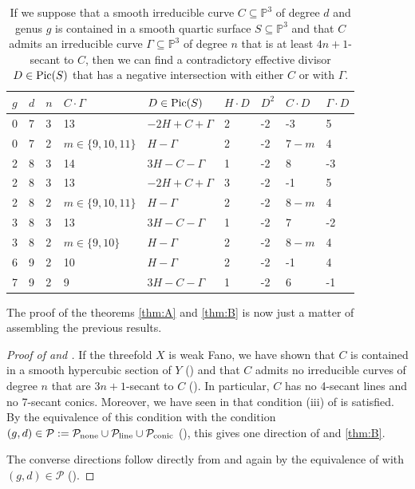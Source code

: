 \documentclass[english,11pt,reqno]{amsart}
\newcommand{\sub}{\subseteq}
\newcommand{\Pthree}{\mathbb{P}^3}
\newcommand{\Pic}{\textup{Pic}}
\begin{document}
%
\begin{table}[H]
	\caption{If we suppose that a smooth irreducible curve $C\sub \Pthree$ of degree $d$ and genus $g$ is contained in a smooth quartic surface $S\sub\Pthree$ and that $C$ admits an irreducible curve $\Gamma\sub \Pthree$ of degree $n$ that is at least $4n+1$-secant to $C$, then we can find a contradictory effective divisor $D\in \Pic(S)$ that has a negative intersection with either $C$ or with $\Gamma$.}
	\label{table:finding_contradictory_divisors_Pthree}
	\begin{minipage}{\textwidth}
		\centering
		\vspace{0.5cm}
		\begin{tabular}{|l|l|l|l|l|l|l|l|l|}
			\hline
			$g$ & $d$ & $n$ & $C\cdot \Gamma$ & $D\in \Pic(S)$ & $H\cdot D$ & $D^2$ & $C\cdot D $ & $\Gamma \cdot D$ \\
			\hline
			0 & 7&3&13& $-2H+C+\Gamma$ & 2 & -2 & -3 & 5\\
			\hline		
			0&7&2 & $m\in\{9,10,11\}$& $H-\Gamma$ & 2 & -2 & $7-m$ & 4\\
			\hline 
			2&8&3 & 14& $3H-C-\Gamma$ & 1 & -2 & 8 & -3\\
			\hline 
			2 & 8 & 3 & 13& $-2H+C+\Gamma$ & 3 & -2 & -1 & 5 \\
			\hline
			2 & 8 & 2 & $m\in\{9,10,11\}$& $H-\Gamma$ & 2 & -2 & $8-m$ & 4\\
			\hline
			3 & 8 & 3 & 13 & $3H-C-\Gamma$ & 1 & -2 &7 & -2 \\
			\hline 
			3 & 8 & 2 &$m\in\{9,10\}$ &$H-\Gamma$&2&-2&$8-m$&4\\
			\hline
			6&9&2&10&$H-\Gamma$& 2 &-2&-1&4\\
			\hline
			7&9&2&9&$3H-C-\Gamma$&1&-2&6&-1\\
			\hline 
		\end{tabular}
	\end{minipage}
\end{table}
%
The proof of the theorems \ref{thm:A} and \ref{thm:B} is now just a matter of assembling the previous results.
%
\begin{proof}[Proof of  and ] 
If the threefold $X$ is weak Fano, we have shown that $C$ is contained in a smooth hypercubic section of $Y$ () and that $C$ admits no irreducible curves of degree $n$ that are $3n+1$-secant to $C$ (). In particular, $C$ has no 4-secant lines and no 7-secant conics. Moreover, we have seen in  that condition (iii) of  is satisfied. By the equivalence of this condition with the condition $(g,d)\in \mathcal{P}:=\mathcal{P}_{\textup{none}} \cup \mathcal{P}_{\textup{line}} \cup \mathcal{P}_{\textup{conic}}$ (), this gives one direction of  and \ref{thm:B}.\par 
The converse directions follow directly from  and again by the equivalence of  with $(g,d)\in \mathcal{P}$ (). 
\end{proof}
\end{document}
